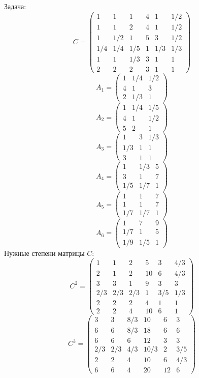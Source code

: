 Задача:
$$C= \begin{pmatrix}
1 & 1 & 1 & 4 & 1 & 1/2\\
1 & 1 & 2 & 4 & 1 & 1/2\\
1 & 1/2 & 1 & 5 & 3 & 1/2\\
1/4 & 1/4 & 1/5 & 1 & 1/3 & 1/3\\
1 & 1 & 1/3 & 3 & 1 & 1\\
2 & 2 & 2 & 3 & 1 & 1
\end{pmatrix}
$$
$$A_1= \begin{pmatrix}
1 & 1/4 & 1/2\\
4 & 1 & 3\\
2 & 1/3 & 1
\end{pmatrix}
$$
$$A_2= \begin{pmatrix}
1 & 1/4 & 1/5\\
4 & 1 & 1/2\\
5 & 2 & 1
\end{pmatrix}
$$
$$A_3= \begin{pmatrix}
1 & 3 & 1/3\\
1/3 & 1 & 1\\
3 & 1 & 1
\end{pmatrix}
$$
$$A_4= \begin{pmatrix}
1 & 1/3 & 5\\
3 & 1 & 7\\
1/5 & 1/7 & 1
\end{pmatrix}
$$
$$A_5= \begin{pmatrix}
1 & 1 & 7\\
1 & 1 & 7\\
1/7 & 1/7 & 1
\end{pmatrix}
$$
$$A_6= \begin{pmatrix}
1 & 7 & 9\\
1/7 & 1 & 5\\
1/9 & 1/5 & 1
\end{pmatrix}
$$
Нужные степени матрицы $C$:
$$C^2 = \begin{pmatrix}
1 & 1 & 2 & 5 & 3 & 4/3\\
2 & 1 & 2 & 10 & 6 & 4/3\\
3 & 3 & 1 & 9 & 3 & 3\\
2/3 & 2/3 & 2/3 & 1 & 3/5 & 1/3\\
2 & 2 & 2 & 4 & 1 & 1\\
2 & 2 & 4 & 10 & 6 & 1
\end{pmatrix}
$$
$$C^3 = \begin{pmatrix}
3 & 3 & 8/3 & 10 & 6 & 3\\
6 & 6 & 8/3 & 18 & 6 & 6\\
6 & 6 & 6 & 12 & 3 & 3\\
2/3 & 2/3 & 4/3 & 10/3 & 2 & 3/5\\
2 & 2 & 4 & 10 & 6 & 4/3\\
6 & 6 & 4 & 20 & 12 & 6
\end{pmatrix}
$$
